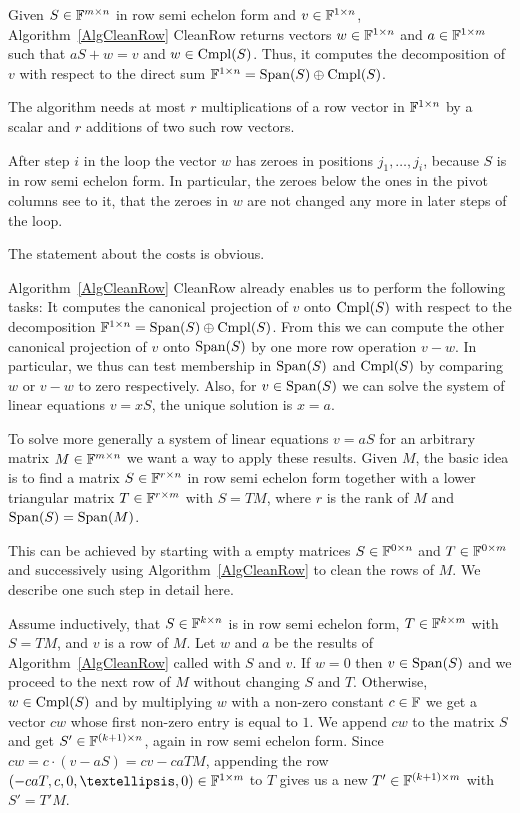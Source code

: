 \begin{Prop}
Given $S \in \mathbb{F}^{m \times n}$ in row semi echelon form and $v \in \mathbb{F}^{1
\times n}$, Algorithm~\ref{AlgCleanRow} \textsf{CleanRow} returns
vectors $w \in \mathbb{F}^{1 \times n}$ and $a \in \mathbb{F}^{1 \times m}$ such that
$aS + w = v$ and $w \in \Cmpl(S)$. Thus, it computes the decomposition
of $v$ with respect to the direct sum 
$\F^{1 \times n} = \Span(S) \oplus \Cmpl(S)$.

The algorithm needs at most $r$ multiplications of a row vector in\/ $\mathbb{F}^{1
\times n}$ by a scalar and $r$ additions of two such row vectors.
\end{Prop}
\Proof After step $i$ in the loop the vector $w$ has zeroes
in positions $j_1, \ldots, j_i$, because $S$ is in row semi echelon form.
In particular, the zeroes below the ones in the pivot columns see to it,
that the zeroes in $w$ are not changed any more in later steps of the loop.

The statement about the costs is obvious.
\ProofEnd

\smallskip
Algorithm~\ref{AlgCleanRow} \textsf{CleanRow} already enables us to perform
the following tasks: It computes the canonical projection of $v$ onto
$\Cmpl(S)$ with respect to the decomposition\/ $\F^{1 \times n} = \Span(S)
\oplus \Cmpl(S)$. From this we can compute the other canonical
projection of $v$ onto $\Span(S)$ by one more row operation $v-w$.
In particular, we thus can test membership in $\Span(S)$ and $\Cmpl(S)$
by comparing $w$ or $v-w$ to zero respectively. Also, for $v \in \Span(S)$
we can solve the system of linear equations $v = xS$, the unique solution
is $x=a$.

To solve more generally a system of linear equations $v=aS$ for an
arbitrary matrix $M \in \mathbb{F}^{m \times n}$ we want a way to apply
these results. Given $M$, the basic idea is to find a matrix
$S \in \mathbb{F}^{r \times n}$ in row semi echelon form together with a
lower triangular matrix $T \in \mathbb{F}^{r \times m}$ with $S = TM$, where $r$
is the rank of $M$ and $\Span(S) = \Span(M)$.

This can be achieved by starting with a empty matrices 
$S \in \mathbb{F}^{0 \times n}$ and $T \in \mathbb{F}^{0 \times m}$ and successively
using Algorithm~\ref{AlgCleanRow} to clean the rows of $M$. We describe
one such step in detail here. 

Assume inductively, that 
$S \in \mathbb{F}^{k \times n}$ is in row semi echelon form,
$T \in \mathbb{F}^{k \times m}$ with $S = TM$, and $v$ is a row of $M$.
Let $w$ and $a$ be the results of Algorithm~\ref{AlgCleanRow} called
with $S$ and $v$. If $w = 0$ then $v \in \Span(S)$ and we proceed to the
next row of $M$ without changing $S$ and $T$. Otherwise, $w \in \Cmpl(S)$
and by multiplying $w$ with a non-zero constant $c \in \mathbb{F}$ we get
a vector $cw$ whose first non-zero entry is equal to $1$. We append
$cw$ to the matrix $S$ and get $S' \in \mathbb{F}^{(k+1) \times n}$,
again in row semi echelon form.
Since $cw = c\cdot (v-aS) = cv - caTM$, appending the row 
$(-caT,c,0,\ldots,0) \in \F^{1 \times m}$ to $T$ gives us a new 
$T' \in \mathbb{F}^{(k+1)\times m}$ with $S' = T'M$.

